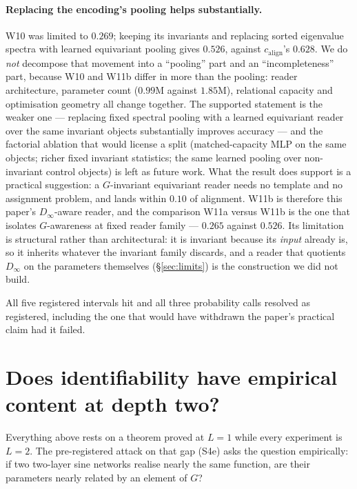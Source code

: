 \documentclass[10pt,letterpaper]{article}
\theoremstyle{definition}
\newcommand{\Dinf}{D_\infty}
\newcommand{\calign}{c_{\mathrm{align}}}
\begin{document}
\paragraph{Replacing the encoding's pooling helps substantially.} W10 was limited to $0.269$;
keeping its invariants and replacing sorted eigenvalue spectra with learned equivariant pooling
gives $0.526$, against $\calign$'s $0.628$. We do \emph{not} decompose that movement into a
``pooling'' part and an ``incompleteness'' part, because W10 and W11b differ in more than the
pooling: reader architecture, parameter count ($0.99$M against $1.85$M), relational capacity and
optimisation geometry all change together. The supported statement is the weaker one --- replacing
fixed spectral pooling with a learned equivariant reader over the same invariant objects
substantially improves accuracy --- and the factorial ablation that would license a split
(matched-capacity MLP on the same objects; richer fixed invariant statistics; the same learned
pooling over non-invariant control objects) is left as future work. What the result does support is
a practical suggestion: a $G$-invariant equivariant reader needs no template and no assignment
problem, and lands within $0.10$ of alignment. W11b is therefore this paper's $\Dinf$-aware reader,
and the comparison W11a versus W11b is the one that isolates $G$-awareness at fixed reader family
--- $0.265$ against $0.526$. Its limitation is structural rather than architectural: it is invariant
because its \emph{input} already is, so it inherits whatever the invariant family discards, and a
reader that quotients $\Dinf$ on the parameters themselves (\S\ref{sec:limits}) is the construction
we did not build.

All five registered intervals hit and all three probability calls resolved as registered, including
the one that would have withdrawn the paper's practical claim had it failed.

\section{Does identifiability have empirical content at depth two?}\label{sec:s4e}

Everything above rests on a theorem proved at $L=1$ while every experiment is $L=2$. The
pre-registered attack on that gap (S4e) asks the question empirically: if two two-layer sine
networks realise nearly the same function, are their parameters nearly related by an element of
$G$?
\end{document}
